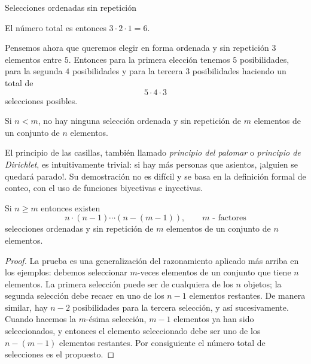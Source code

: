 \begin{section}{Selecciones ordenadas sin repetición}


El número total es entonces $3 \cdot 2 \cdot 1 = 6$.

Pensemos ahora que queremos elegir en forma ordenada y sin repetición $3$ elementos entre $5$. Entonces para la primera elección tenemos $5$ posibilidades, para la segunda $4$ posibilidades y para la tercera $3$ posibilidades haciendo un total de 
$$
5 \cdot 4 \cdot 3
$$
selecciones posibles. 


\begin{proposicion}
    Si $n < m$, no hay ninguna selección ordenada y  sin repetición de $m$ elementos  de un conjunto de $n$ elementos.
\end{proposicion}

El principio de las casillas, también llamado \textit{principio del palomar} o \textit{principio de Dirichlet}, es intuitivamente trivial: si hay más personas que asientos, ¡alguien se quedará parado!. Su demostración no es difícil y se basa en la definición formal de conteo, con el uso de funciones biyectivas e inyectivas.

\begin{proposicion}\label{prop1}
Si $n \ge m$ entonces existen
\begin{equation*}
 n \cdot (n - 1) \cdots (n - (m - 1)), \qquad \text{$m$ - factores}
\end{equation*}
selecciones ordenadas y sin repetición de $m$ elementos de un conjunto de $n$ elementos.
\end{proposicion}
\begin{proof} La prueba es una generalización del razonamiento aplicado más arriba en los e\-jem\-plos: debemos seleccionar $m$-veces elementos de un conjunto que tiene $n$ elementos. La primera selección puede ser de cualquiera de los $n$ objetos; la segunda selección debe recaer en uno de los $n-1$ elementos restantes. De manera similar, hay $n-2$ posibilidades para la tercera selección, y así sucesivamente. Cuando hacemos la $m$-ésima selección, $m-1$ elementos ya han sido seleccionados, y entonces el elemento seleccionado debe ser uno de los $n-(m-1)$ elementos restantes. Por consiguiente el número total de
selecciones es el propuesto. 
\end{proof}


\end{section}
